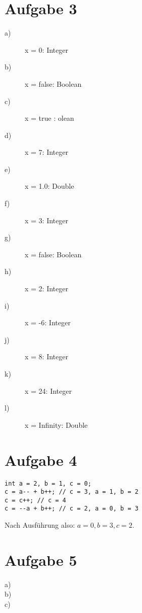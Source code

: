 \section{Aufgabe 3}
\begin{description}
\item[a)] x = 0: 	 Integer
\item[b)] x = false: 	 Boolean
\item[c)] x = true 	: 	olean
\item[d)] x = 7: 	 Integer
\item[e)] x = 1.0: 	 Double
\item[f)] x = 3: 	 Integer
\item[g)] x = false: 	 Boolean
\item[h)] x = 2: 	 Integer
\item[i)] x = -6: 	 Integer
\item[j)] x = 8: 	 Integer
\item[k)] x = 24: 	 Integer
\item[l)] x = Infinity: 	 Double
\end{description}

\section{Aufgabe 4}
\begin{lstlisting}
int a = 2, b = 1, c = 0;
c = a-- + b++; // c = 3, a = 1, b = 2
c = c++; // c = 4
c = --a + b++; // c = 2, a = 0, b = 3
\end{lstlisting}
Nach Ausführung also: $a = 0, b = 3, c = 2$.

\section{Aufgabe 5}
\begin{description}
\item[a)] 
\item[b)] 
\item[c)]
\end{description}




